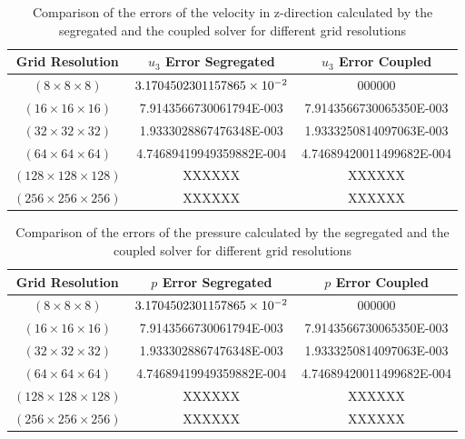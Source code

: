\begin{table}[h!]
    \doublespacing
    \centering \begin{tabular}{ |c|c|c| }
    \hline
    Grid Resolution & \(u_3\) Error Segregated & \(u_3\) Error Coupled \\ \hline
  \((8\times8\times8)\)        &  \(3.1704502301157865\times 10^{-2}\)  &  000000 \\ \hline 
    \((16\times16\times16)\)     &  7.9143566730061794E-003  &  7.9143566730065350E-003 \\ \hline
    \((32\times32\times32)\)     &  1.9333028867476348E-003  &  1.9333250814097063E-003 \\ \hline
    \((64\times64\times64)\)     &  4.74689419949359882E-004 &  4.74689420011499682E-004 \\ \hline
    \((128\times128\times128)\)  &  XXXXXX & XXXXXX \\ \hline
    \((256\times256\times256)\)  &  XXXXXX & XXXXXX \\ \hline
    \end{tabular}
    \caption{Comparison of the errors of the velocity in z-direction calculated by the segregated and the coupled solver for different grid resolutions}
    \label{tab:fehler}
\end{table}

\begin{table}[h!]
    \doublespacing
    \centering \begin{tabular}{ |c|c|c| }
    \hline
    Grid Resolution & \(p\) Error Segregated & \(p\) Error Coupled \\ \hline
  \((8\times8\times8)\)        &  \(3.1704502301157865\times 10^{-2}\)  &  000000 \\ \hline 
    \((16\times16\times16)\)     &  7.9143566730061794E-003  &  7.9143566730065350E-003 \\ \hline
    \((32\times32\times32)\)     &  1.9333028867476348E-003  &  1.9333250814097063E-003 \\ \hline
    \((64\times64\times64)\)     &  4.74689419949359882E-004 &  4.74689420011499682E-004 \\ \hline
    \((128\times128\times128)\)  &  XXXXXX & XXXXXX \\ \hline
    \((256\times256\times256)\)  &  XXXXXX & XXXXXX \\ \hline
    \end{tabular}
    \caption{Comparison of the errors of the pressure calculated by the segregated and the coupled solver for different grid resolutions}
    \label{tab:fehler}
\end{table}

